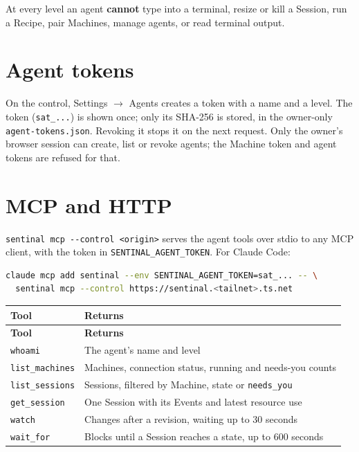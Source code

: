 At every level an agent \textbf{cannot} type into a terminal, resize or kill a Session, run a Recipe, pair Machines, manage agents, or read terminal output.

\section{\texorpdfstring{Agent tokens}{Agent tokens}}

On the control, Settings $\rightarrow$ Agents creates a token with a name and a level. The token (\texttt{sat\_\allowbreak{}.\allowbreak{}.\allowbreak{}.\allowbreak{}}) is shown once; only its SHA-256 is stored, in the owner-only \texttt{agent-{}\allowbreak{}tokens.\allowbreak{}json}. Revoking it stops it on the next request. Only the owner's browser session can create, list or revoke agents; the Machine token and agent tokens are refused for that.

\section{\texorpdfstring{MCP and HTTP}{MCP and HTTP}}

\texttt{sentinal\ mcp\ -{}\allowbreak{}-{}\allowbreak{}control\ \textless{}origin\textgreater{}} serves the agent tools over stdio to any MCP client, with the token in \texttt{SENTINAL\_\allowbreak{}AGENT\_\allowbreak{}TOKEN}. For Claude Code:

\begin{lstlisting}[language=sh]
claude mcp add sentinal --env SENTINAL_AGENT_TOKEN=sat_... -- \
  sentinal mcp --control https://sentinal.<tailnet>.ts.net
\end{lstlisting}

\begin{small}
\begin{longtable}{>{\raggedright\arraybackslash}p{0.256\dimexpr \linewidth-4\tabcolsep\relax}>{\raggedright\arraybackslash}p{0.744\dimexpr \linewidth-4\tabcolsep\relax}}
\toprule
\textbf{Tool} & \textbf{Returns} \\
\midrule
\endfirsthead
\toprule
\textbf{Tool} & \textbf{Returns} \\
\midrule
\endhead
\texttt{whoami} & The agent's name and level \\
\texttt{list\_\allowbreak{}machines} & Machines, connection status, running and needs-you counts \\
\texttt{list\_\allowbreak{}sessions} & Sessions, filtered by Machine, state or \texttt{needs\_\allowbreak{}you} \\
\texttt{get\_\allowbreak{}session} & One Session with its Events and latest resource use \\
\texttt{watch} & Changes after a revision, waiting up to 30 seconds \\
\texttt{wait\_\allowbreak{}for} & Blocks until a Session reaches a state, up to 600 seconds \\
\bottomrule
\end{longtable}
\end{small}

